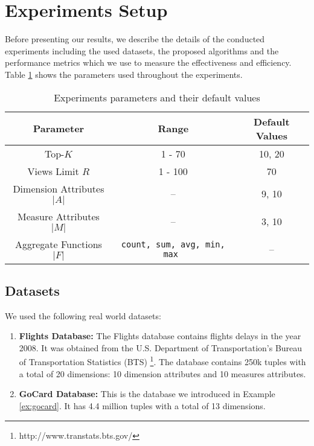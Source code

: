 \section{Experiments Setup}
\label{sec:testbed}
%
Before presenting our results, we describe the details of the conducted experiments including the used datasets, the proposed algorithms and the performance metrics which we use to measure the effectiveness and efficiency.
%
Table \ref{tab:parameters} shows the parameters used throughout the experiments.
%
\begin{table}[t]
\centering
\caption{Experiments parameters and their default values}
{
\begin{tabular}{|c|c|c|} \hline
\textbf{Parameter} & \textbf{Range} & \textbf{Default Values}\\ \hline
	Top-$K$ & 1 - 70 & 10, 20 \\ \hline
	Views Limit $R$ & 1 - 100 & 70  \\ \hline
	Dimension Attributes $|A|$ & -- & 9, 10 \\ \hline
	Measure Attributes  $|M|$ & -- & 3,  10 \\ \hline
	Aggregate Functions $|F|$ & \texttt{count, sum, avg, min, max } & --  \\ \hline
\end{tabular}}
\label{tab:parameters}
\end{table}
%
\subsection{Datasets}
%
We used the following real world datasets:
%
\begin{enumerate}
%
\item \textbf{Flights Database:} The Flights database contains flights delays in the year 2008. 
%
It was obtained from the U.S. Department of Transportation's Bureau of Transportation Statistics (BTS) \footnote { http://www.transtats.bts.gov/}. 
%
The database contains 250k tuples with a total of 20 dimensions: 10 dimension attributes and 10 measures attributes. 
%
\item \textbf{GoCard Database:} This is the database we introduced in Example \ref{ex:gocard}.
%
It has 4.4 million tuples with a total of 13 dimensions.
%
%
\end{enumerate}
%
